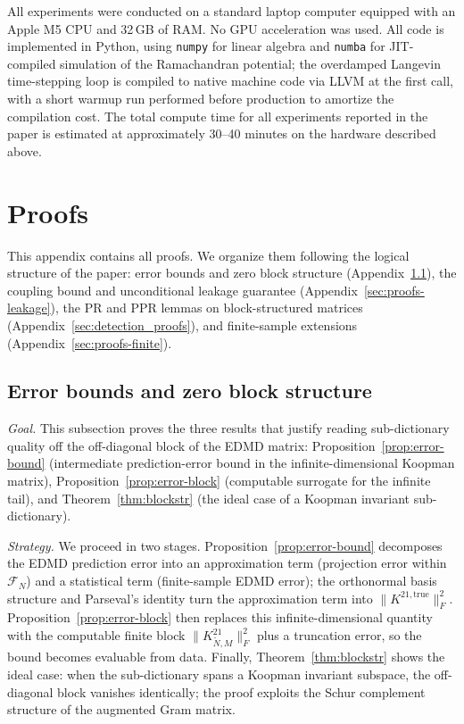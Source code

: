 \documentclass{article}
\theoremstyle{plain}
\theoremstyle{definition}
\def\Fc{\mathcal{F}}
\newcommand{\arXivtag}[1][]{#1}
\begin{document}
All experiments were conducted on a standard laptop computer equipped with an Apple M5 CPU and 32\,GB of RAM. No GPU acceleration was used. All code is implemented in Python, using \texttt{numpy} for linear algebra and \texttt{numba} for JIT-compiled simulation of the Ramachandran potential; the overdamped Langevin time-stepping loop is compiled to native machine code via LLVM at the first call, with a short warmup run performed before production to amortize the compilation cost. \arXivtag
The total compute time for all experiments reported in the paper is estimated at approximately 30--40 minutes on the hardware described above.

\section{Proofs}\label{sec:proofs}

This appendix contains all proofs. We organize them following the logical structure of the paper: error bounds and zero block structure (Appendix~\ref{sec:proofs-error}), the coupling bound and unconditional leakage guarantee (Appendix~\ref{sec:proofs-leakage}), the PR and PPR lemmas on block-structured matrices (Appendix~\ref{sec:detection_proofs}), and finite-sample extensions (Appendix~\ref{sec:proofs-finite}).

\subsection{Error bounds and zero block structure}\label{sec:proofs-error}

\emph{Goal.} This subsection proves the three results that justify reading sub-dictionary quality off the off-diagonal block of the EDMD matrix: Proposition~\ref{prop:error-bound} (intermediate prediction-error bound in the infinite-dimensional Koopman matrix), Proposition~\ref{prop:error-block} (computable surrogate for the infinite tail), and Theorem~\ref{thm:blockstr} (the ideal case of a Koopman invariant sub-dictionary).

\emph{Strategy.} We proceed in two stages. Proposition~\ref{prop:error-bound} decomposes the EDMD prediction error into an approximation term (projection error within $\Fc_N$) and a statistical term (finite-sample EDMD error); the orthonormal basis structure and Parseval's identity turn the approximation term into $\|K^{21,\text{true}}\|_F^2$. Proposition~\ref{prop:error-block} then replaces this infinite-dimensional quantity with the computable finite block $\|K_{\tilde{N},M}^{21}\|_F^2$ plus a truncation error, so the bound becomes evaluable from data. Finally, Theorem~\ref{thm:blockstr} shows the ideal case: when the sub-dictionary spans a Koopman invariant subspace, the off-diagonal block vanishes identically; the proof exploits the Schur complement structure of the augmented Gram matrix.
\end{document}
